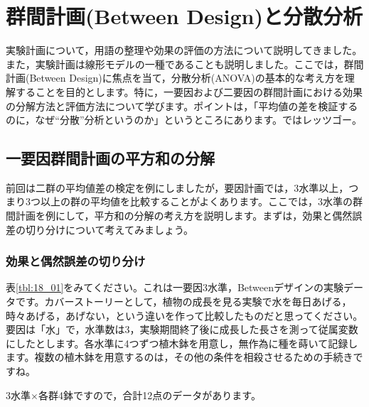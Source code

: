 \documentclass{ltjbook}
\begin{document}
\chapter{群間計画(Between Design)と分散分析}
\label{ch18_BetweenDesign}


実験計画について，用語の整理や効果の評価の方法について説明してきました。また，実験計画は線形モデルの一種であることも説明しました。ここでは，群間計画(Between Design)に焦点を当て，分散分析(ANOVA)の基本的な考え方を理解することを目的とします。特に，一要因および二要因の群間計画における効果の分解方法と評価方法について学びます。ポイントは，「平均値の差を検証するのに，なぜ``分散''分析というのか」というところにあります。ではレッツゴー。

\section{一要因群間計画の平方和の分解}

前回は二群の平均値差の検定を例にしましたが，要因計画では，3水準以上，つまり3つ以上の群の平均値を比較することがよくあります。ここでは，3水準の群間計画を例にして，平方和の分解の考え方を説明します。まずは，効果と偶然誤差の切り分けについて考えてみましょう。

\subsection{効果と偶然誤差の切り分け}
\label{Design_effect}
表\ref{tbl:18_01}をみてください。これは一要因3水準，Betweenデザインの実験データです。カバーストーリーとして，植物の成長を見る実験で水を毎日あげる，時々あげる，あげない，という違いを作って比較したものだと思ってください。要因は「水」で，水準数は3，実験期間終了後に成長した長さを測って従属変数にしたとします。各水準に4つずつ植木鉢を用意し，無作為に種を蒔いて記録します。複数の植木鉢を用意するのは，その他の条件を相殺させるための手続きですね。

3水準$\times$各群4鉢ですので，合計12点のデータがあります。
\end{document}
